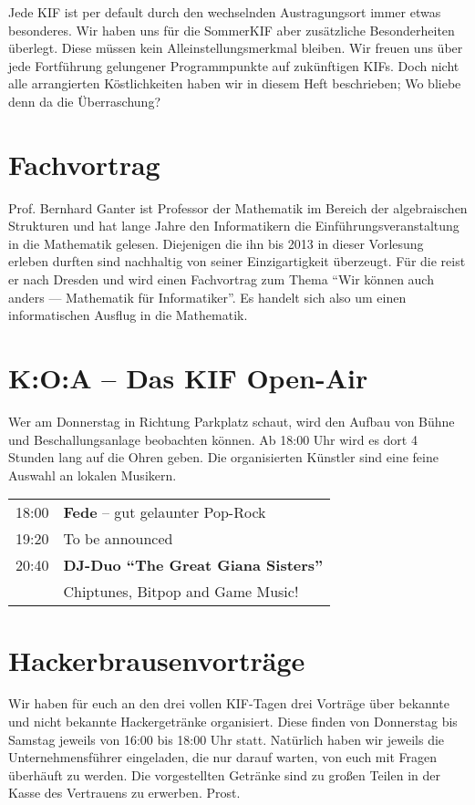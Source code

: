 
Jede KIF ist per default durch den wechselnden Austragungsort immer etwas besonderes.
Wir haben uns für die SommerKIF aber zusätzliche Besonderheiten überlegt.
Diese müssen kein Alleinstellungsmerkmal bleiben.
Wir freuen uns über jede Fortführung gelungener Programmpunkte auf zukünftigen KIFs.
Doch nicht alle arrangierten Köstlichkeiten haben wir in diesem Heft beschrieben; Wo bliebe denn da die Überraschung?

\section*{Fachvortrag}
Prof. Bernhard Ganter ist Professor der Mathematik im Bereich der algebraischen Strukturen und hat lange Jahre den Informatikern die Einführungsveranstaltung in die Mathematik gelesen.
Diejenigen die ihn bis 2013 in dieser Vorlesung erleben durften sind nachhaltig von seiner Einzigartigkeit überzeugt.
Für die \KIF{} reist er nach Dresden und wird einen Fachvortrag zum Thema \enquote{Wir können auch anders --- Mathematik für Informatiker}.
Es handelt sich also um einen informatischen Ausflug in die Mathematik.

\section*{K:O:A -- Das KIF Open-Air}
Wer am Donnerstag in Richtung Parkplatz schaut, wird den Aufbau von Bühne und Beschallungsanlage beobachten können.
Ab 18:00 Uhr wird es dort 4 Stunden lang auf die Ohren geben.
Die organisierten Künstler sind eine feine Auswahl an lokalen Musikern.
\vspace{10pt}

\begin{tabular}{rl}
    18:00 & \textbf{Fede} -- gut gelaunter Pop-Rock \\

    19:20 & To be announced\\

    20:40 & \textbf{DJ-Duo \enquote{The Great Giana Sisters}}\\
    &Chiptunes, Bitpop and Game Music!
\end{tabular}

\section*{Hackerbrausenvorträge}
Wir haben für euch an den drei vollen KIF-Tagen drei Vorträge über bekannte und nicht bekannte Hackergetränke organisiert.
Diese finden von Donnerstag bis Samstag jeweils von 16:00 bis 18:00 Uhr statt.
Natürlich haben wir jeweils die Unternehmensführer eingeladen, die nur darauf warten, von euch mit Fragen überhäuft zu werden.
Die vorgestellten Getränke sind zu großen Teilen in der Kasse des Vertrauens zu erwerben. Prost.


